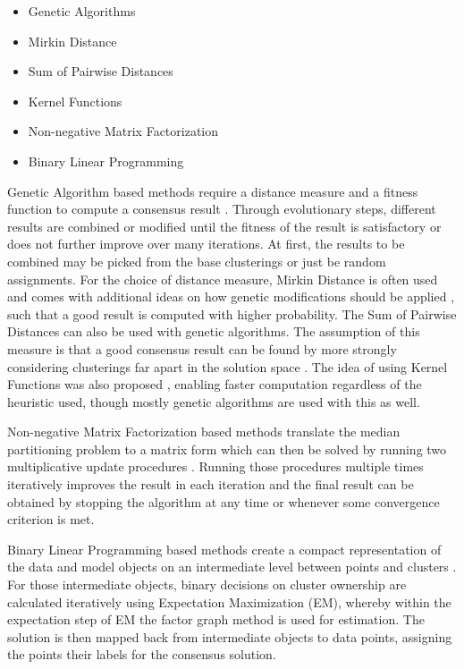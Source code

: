 \documentclass[
	a4paper,
	english,
	twoside,
	openright,               
	11pt                            
	]{report}
\begin{document}
\begin{itemize}
  \item Genetic Algorithms
  \item Mirkin Distance
  \item Sum of Pairwise Distances
  \item Kernel Functions
  \item Non-negative Matrix Factorization
  \item Binary Linear Programming
\end{itemize}

Genetic Algorithm based methods require a distance measure and a fitness function to compute a consensus result \cite{Cristofor2002FindingMP}. Through evolutionary steps, different results are combined or modified until the fitness of the result is satisfactory or does not further improve over many iterations. At first, the results to be combined may be picked from the base clusterings or just be random assignments. For the choice of distance measure, Mirkin Distance is often used and comes with additional ideas on how genetic modifications should be applied \cite{5766165}, such that a good result is computed with higher probability. The Sum of Pairwise Distances can also be used with genetic algorithms. The assumption of this measure is that a good consensus result can be found by more strongly considering clusterings far apart in the solution space \cite{6694095}. The idea of using Kernel Functions was also proposed \cite{Vega-Pons:2010:WPC:1786814.1787121}, enabling faster computation regardless of the heuristic used, though mostly genetic algorithms are used with this as well.

Non-negative Matrix Factorization based methods translate the median partitioning problem to a matrix form which can then be solved by running two multiplicative update procedures \cite{Li:2007:SCS:1441428.1442121}. Running those procedures multiple times iteratively improves the result in each iteration and the final result can be obtained by stopping the algorithm at any time or whenever some convergence criterion is met.

Binary Linear Programming based methods create a compact representation of the data and model objects on an intermediate level between points and clusters \cite{HUANG2016131}. For those intermediate objects, binary decisions on cluster ownership are calculated iteratively using Expectation Maximization (EM), whereby within the expectation step of EM the factor graph method \cite{HUANG2016131} is used for estimation. The solution is then mapped back from intermediate objects to data points, assigning the points their labels for the consensus solution.
\end{document}
